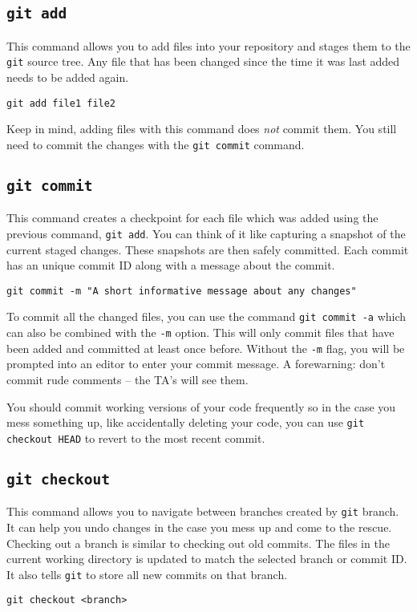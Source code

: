 \documentclass[11pt]{article}
\begin{document}
\subsection{\texttt{git add}}
This command allows you to add files into your repository and stages them to
the \texttt{git} source tree. Any file that has been changed since the time it was last
added needs to be added again.
\begin{lstlisting}
git add file1 file2
\end{lstlisting}

Keep in mind, adding files with this command does \emph{not} commit them. You still need to commit the changes with the \texttt{git commit} command.

\subsection{\texttt{git commit}}
This command creates a checkpoint for each file which was added using the previous command, \texttt{git add}. You can think of it like capturing a snapshot of the current staged changes. These snapshots are then safely committed. Each commit has an unique commit ID along with a message about the commit.
\begin{lstlisting}
git commit -m "A short informative message about any changes"
\end{lstlisting}

To commit all the changed files, you can use the command \texttt{git commit -a} which can also be combined with the \texttt{-m} option. This will only commit files that have been added and committed at least once before. Without the \texttt{-m} flag, you will be prompted into an editor to enter your commit message. A forewarning: don't commit rude comments -- the TA's will see them.

You should commit working versions of your code frequently so in the case you mess something up, like accidentally deleting your code, you can use \texttt{git checkout HEAD} to revert to the most recent commit.

\subsection{\texttt{git checkout}}
This command allows you to navigate between branches created by \texttt{git} branch. It can help you undo changes in the case you mess up and come to the rescue. Checking out a branch is similar to checking out old commits. The files in the current working directory is updated to match the selected branch or commit ID. It also tells \texttt{git} to store all new commits on that branch.
\begin{lstlisting}
git checkout <branch>
\end{lstlisting}
\end{document}
